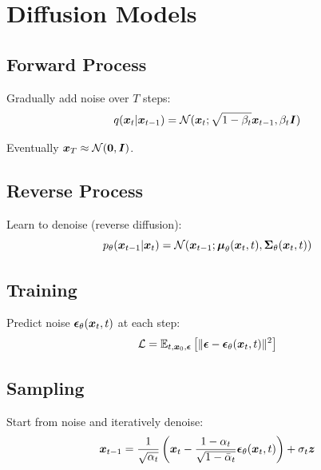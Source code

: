 
\section{Diffusion Models}
\label{sec:diffusion-models}

\subsection{Forward Process}

Gradually add noise over $T$ steps:
\begin{equation}
q(\boldsymbol{x}_t|\boldsymbol{x}_{t-1}) = \mathcal{N}(\boldsymbol{x}_t; \sqrt{1-\beta_t} \boldsymbol{x}_{t-1}, \beta_t \boldsymbol{I})
\end{equation}

Eventually $\boldsymbol{x}_T \approx \mathcal{N}(\boldsymbol{0}, \boldsymbol{I})$.

\subsection{Reverse Process}

Learn to denoise (reverse diffusion):
\begin{equation}
p_{\theta}(\boldsymbol{x}_{t-1}|\boldsymbol{x}_t) = \mathcal{N}(\boldsymbol{x}_{t-1}; \boldsymbol{\mu}_{\theta}(\boldsymbol{x}_t, t), \boldsymbol{\Sigma}_{\theta}(\boldsymbol{x}_t, t))
\end{equation}

\subsection{Training}

Predict noise $\boldsymbol{\epsilon}_{\theta}(\boldsymbol{x}_t, t)$ at each step:
\begin{equation}
\mathcal{L} = \mathbb{E}_{t, \boldsymbol{x}_0, \boldsymbol{\epsilon}}\left[\|\boldsymbol{\epsilon} - \boldsymbol{\epsilon}_{\theta}(\boldsymbol{x}_t, t)\|^2\right]
\end{equation}

\subsection{Sampling}

Start from noise and iteratively denoise:
\begin{equation}
\boldsymbol{x}_{t-1} = \frac{1}{\sqrt{\alpha_t}}\left(\boldsymbol{x}_t - \frac{1-\alpha_t}{\sqrt{1-\bar{\alpha}_t}}\boldsymbol{\epsilon}_{\theta}(\boldsymbol{x}_t, t)\right) + \sigma_t \boldsymbol{z}
\end{equation}

